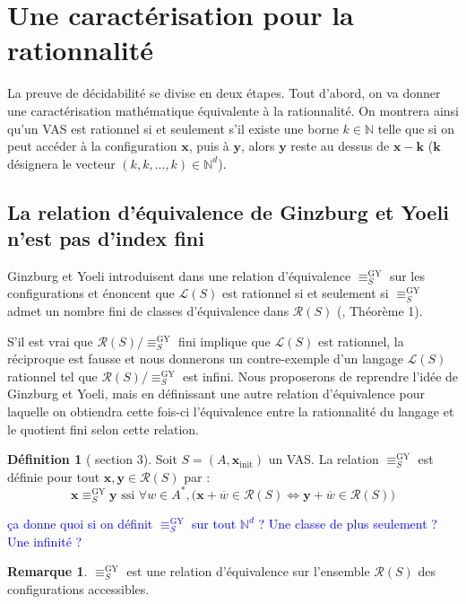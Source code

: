 \documentclass[a4paper,final]{article}
\theoremstyle{definition}
\newtheorem{Definition}[Theorem]{Définition}
\newtheorem*{Remark}{Remarque}
\newcommand{\alain}[1]{\textcolor{blue}{#1}}
\newcommand{\N}{\ensuremath{\mathbb{N}}}
\newcommand{\lang}{\ensuremath{\mathcal{L}}}
\newcommand{\conf}{\ensuremath{\mathcal{R}}}
\newcommand{\vect}[1]{\ensuremath{\mathbf{#1}}}
\newcommand{\relGY}{\ensuremath{\equiv^\text{GY}_S}}
\newcommand{\ssi}{\ensuremath{\text{ ssi }}}
\newcommand{\equivaut}{\ensuremath{\Leftrightarrow}}
\newcommand{\xinit}{\ensuremath{\vect{x}_\text{init}}}
\newcommand{\valeur}[1]{\ensuremath{\overline{#1}}}
\begin{document}

\section{Une caractérisation pour la rationnalité}

La preuve de décidabilité se divise en deux étapes.
Tout d'abord, on va donner une caractérisation mathématique équivalente à la rationnalité.
On montrera ainsi qu'un VAS est rationnel si et seulement s'il existe une borne $k\in\N$ telle que si on peut accéder à la configuration $\vect{x}$, puis à $\vect{y}$, alors $\vect{y}$ reste au dessus de $\vect{x}-\vect{k}$
($\vect{k}$ désignera le vecteur $(k,k,...,k)\in\N^d$).

\subsection{La relation d'équivalence de Ginzburg et Yoeli n'est pas d'index fini}

Ginzburg et Yoeli introduisent dans \cite{giyo80} une relation d'équivalence $\relGY$ sur les configurations et énoncent que $\lang(S)$ est rationnel si et seulement si $\relGY$ admet un nombre fini de classes d'équivalence dans $\conf(S)$ (\cite{giyo80}, Théorème 1).

S'il est vrai que $\conf(S)/\relGY$ fini implique que $\lang(S)$ est rationnel, la réciproque est fausse et nous donnerons un contre-exemple d'un langage $\lang(S)$ rationnel tel que $\conf(S)/\relGY$ est infini. 
Nous proposerons de reprendre l'idée de Ginzburg et Yoeli,
mais en définissant une autre relation d'équivalence pour laquelle on obtiendra cette fois-ci l'équivalence entre la rationnalité du langage et le quotient fini selon cette relation.

\begin{Definition}[\cite{giyo80} section 3]
Soit $S=(A,\xinit)$ un VAS. La relation $\relGY$ est définie pour tout $\vect{x},\vect{y} \in\conf(S)$ par : 
$$\vect{x}\relGY\vect{y} \ssi \forall w\in A^\ast, \big( \vect{x} +\valeur{w}\in\conf(S) \equivaut \vect{y} +\valeur{w}\in\conf(S) \big)$$
\end{Definition}
\alain{ça donne quoi si on définit $\relGY$ sur tout $\N^d$ ? Une classe de plus seulement ? Une infinité ?}

\begin{Remark}
$\relGY$ est une relation d'équivalence sur l'ensemble $\conf(S)$ des configurations accessibles.
\end{Remark}
\end{document}
